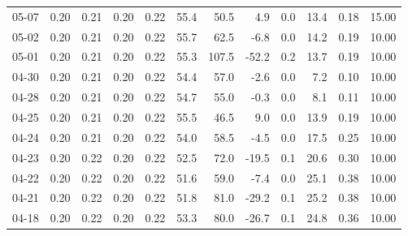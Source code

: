 \begin{threeparttable}
{\begin{tabular}{lrrrrrrrrrrr}
  05-07 &          0.20 &          0.21 &          0.20 &        0.22 &                55.4 &                50.5 &        4.9 &                 0.0 &             13.4 &            0.18 &                  15.00 \\
  05-02 &          0.20 &          0.21 &          0.20 &        0.22 &                55.7 &                62.5 &       -6.8 &                 0.0 &             14.2 &            0.19 &                  10.00 \\
  05-01 &          0.20 &          0.21 &          0.20 &        0.22 &                55.3 &               107.5 &      -52.2 &                 0.2 &             13.7 &            0.19 &                  10.00 \\
  04-30 &          0.20 &          0.21 &          0.20 &        0.22 &                54.4 &                57.0 &       -2.6 &                 0.0 &              7.2 &            0.10 &                  10.00 \\
  04-28 &          0.20 &          0.21 &          0.20 &        0.22 &                54.7 &                55.0 &       -0.3 &                 0.0 &              8.1 &            0.11 &                  10.00 \\
  04-25 &          0.20 &          0.21 &          0.20 &        0.22 &                55.5 &                46.5 &        9.0 &                 0.0 &             13.9 &            0.19 &                  10.00 \\
  04-24 &          0.20 &          0.21 &          0.20 &        0.22 &                54.0 &                58.5 &       -4.5 &                 0.0 &             17.5 &            0.25 &                  10.00 \\
  04-23 &          0.20 &          0.22 &          0.20 &        0.22 &                52.5 &                72.0 &      -19.5 &                 0.1 &             20.6 &            0.30 &                  10.00 \\
  04-22 &          0.20 &          0.22 &          0.20 &        0.22 &                51.6 &                59.0 &       -7.4 &                 0.0 &             25.1 &            0.38 &                  10.00 \\
  04-21 &          0.20 &          0.22 &          0.20 &        0.22 &                51.8 &                81.0 &      -29.2 &                 0.1 &             25.2 &            0.38 &                  10.00 \\
  04-18 &          0.20 &          0.22 &          0.20 &        0.22 &                53.3 &                80.0 &      -26.7 &                 0.1 &             24.8 &            0.36 &                  10.00 \\

\end{tabular}}
\end{threeparttable}
